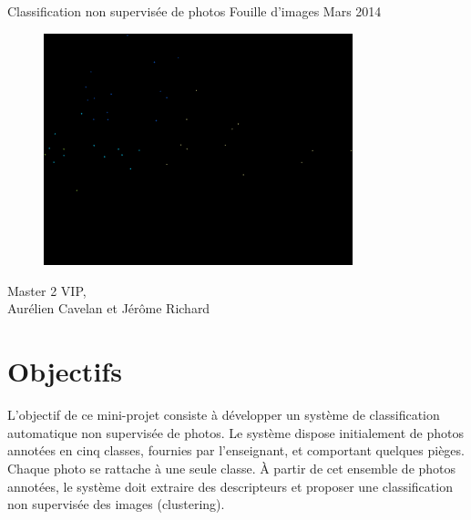 \documentclass[12pt,a4paper,utf8x]{report}
\begin{document}
\begin{titlepage}
\hfill
  \begin{center}
    \begin{minipage}[t]{12cm} 
    \huge \center Classification non supervisée de photos
    \huge \center Fouille d'images
    \huge \center Mars 2014
    \end{minipage}
  \end{center}
\vfill
\begin{figure}[!h]
      \centering            
      \includegraphics[width=0.8\textwidth]{ACP_SIFT.png} 
    \end{figure}
\begin{flushleft}
\begin{minipage}[t]{5cm}
Master 2 VIP, \\ Aurélien Cavelan et Jérôme Richard
\end{minipage}
\end{flushleft}

\end{titlepage}
\tableofcontents

\chapter{Objectifs}

L'objectif de ce mini-projet consiste à développer un système de classification automatique non supervisée de photos. Le système dispose initialement de photos annotées en cinq classes, fournies par l'enseignant, et comportant quelques pièges. Chaque photo se rattache à une seule classe. À partir de cet ensemble de photos annotées, le système doit extraire des descripteurs et proposer une classification non supervisée des images (clustering).
\end{document}
